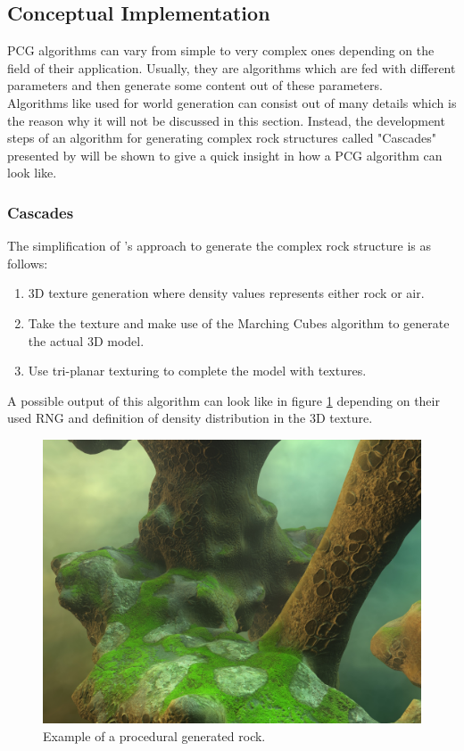 \documentclass[MGS,Master,english]{twbook}%
\begin{document}
\subsection{Conceptual Implementation}
PCG algorithms can vary from simple to very complex ones depending on the field of their application. Usually, they are algorithms which are fed with different parameters and then generate some content out of these parameters.\\
Algorithms like used for world generation can consist out of many details which is the reason why it will not be discussed in this section. Instead, the development steps of an algorithm for generating complex rock structures called "Cascades" presented by \cite{nvidia::cascades} will be shown to give a quick insight in how a PCG algorithm can look like.

\subsubsection{Cascades}
The simplification of \cite{nvidia::cascades}'s approach to generate the complex rock structure is as follows:
\begin{enumerate}
	\item 3D texture generation where density values represents either rock or air.
	\item Take the texture and make use of the Marching Cubes algorithm to generate the actual 3D model.
	\item Use tri-planar texturing to complete the model with textures.
\end{enumerate}
A possible output of this algorithm can look like in figure \ref{cascadesFigure} depending on their used \ac{RNG} and definition of density distribution in the 3D texture. 
\begin{figure}[!htbp]
	\centering
	\includegraphics[width=0.5\linewidth]{PICs/cascades}
	\caption{Example of a procedural generated rock. \protect\cite{nvidia::cascades}}\label{cascadesFigure}
\end{figure}
\end{document}
